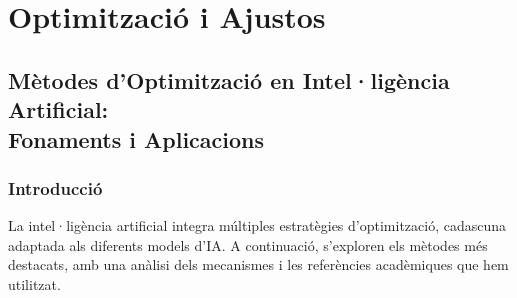 \chapter{Optimització i Ajustos}\label{a:optimitzacioAjustos}
\section{Mètodes d'Optimització en Intel·ligència Artificial:\\Fonaments i Aplicacions}

\subsection*{Introducció}
La intel·ligència artificial integra múltiples estratègies d'optimització, cadascuna adaptada als diferents models d'IA. A continuació, s'exploren els mètodes més destacats, amb una anàlisi dels mecanismes i les referències acadèmiques que hem utilitzat.
